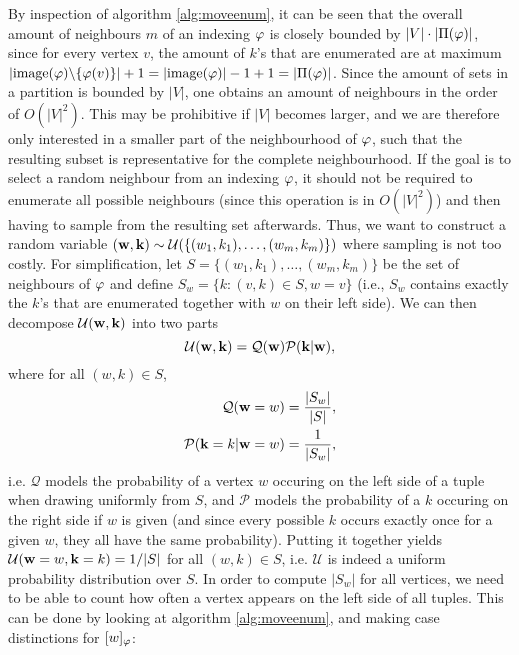 By inspection of algorithm \ref{alg:moveenum}, it can be seen that the overall amount of neighbours $m$ of an indexing $\varphi$ is closely bounded by $|V|\cdot |\Pi(\varphi)|$, since for every vertex $v$, the amount of $k$'s that are enumerated are at maximum $|\mathrm{image}(\varphi)\backslash\{ \varphi(v) \}| + 1 = |\mathrm{image}(\varphi)|-1+1 = |\Pi(\varphi)|$. Since the amount of sets in a partition is bounded by $|V|$, one obtains an amount of neighbours in the order of $O(|V|^2)$. This may be prohibitive if $|V|$ becomes larger, and we are therefore only interested in a smaller part of the neighbourhood of $\varphi$, such that the resulting subset is representative for the complete neighbourhood. If the goal is to select a random neighbour from an indexing $\varphi$, it should not be required to enumerate all possible neighbours (since this operation is in $O(|V|^2)$) and then having to sample from the resulting set afterwards. Thus, we want to construct a random variable $({\bf w}, {\bf k}) \sim \mathcal{U}(\{ (w_1,k_1),\dots,(w_m,k_m) \})$ where sampling is not too costly. For simplification, let $S = \{ (w_1,k_1),\dots,(w_m,k_m) \}$ be the set of neighbours of $\varphi$ and define $S_w = \{ k : (v,k) \in S, w=v \}$ (i.e., $S_w$ contains exactly the $k$'s that are enumerated together with $w$ on their left side). We can then decompose $\mathcal{U}({\bf w}, {\bf k})$ into two parts
$$ \mathcal{U}({\bf w}, {\bf k}) = \mathcal{Q}({\bf w}) \mathcal{P}({\bf k}|{\bf w}), $$ where for all $(w,k) \in S$,
\begin{align*}
    \mathcal{Q}({\bf w} = w) &= \frac{| S_w |}{|S|},\\
    \mathcal{P}({\bf k} = k | {\bf w} = w) &= \frac{1}{| S_w |},
\end{align*}
i.e. $\mathcal{Q}$ models the probability of a vertex $w$ occuring on the left side of a tuple when drawing uniformly from $S$, and $\mathcal{P}$ models the probability of a $k$ occuring on the right side if $w$ is given (and since every possible $k$ occurs exactly once for a given $w$, they all have the same probability). Putting it together yields $\mathcal{U}({\bf w}=w, {\bf k}=k) = 1/|S|$ for all $(w,k) \in S$, i.e. $\mathcal{U}$ is indeed a uniform probability distribution over $S$. In order to compute $|S_w|$ for all vertices, we need to be able to count how often a vertex appears on the left side of all tuples. This can be done by looking at algorithm \ref{alg:moveenum}, and making case distinctions for $[w]_\varphi$:
